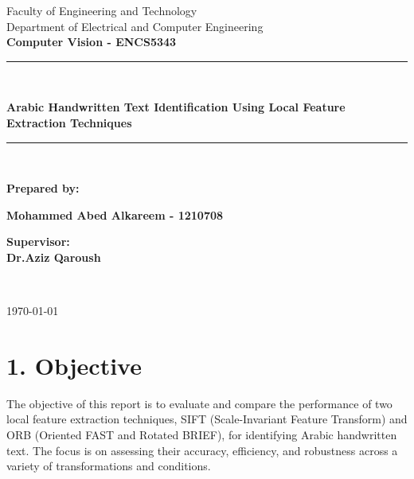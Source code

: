 \documentclass[12pt]{article}
\begin{document}
\begin{titlepage}
    \centering
    \vspace{-2cm}
    
    \vspace{1.5cm}


    {\Large Faculty of Engineering and Technology\\}
    {\Large Department of Electrical and Computer Engineering\\}
    \vspace{1cm}
    {\Large\bfseries \textbf{Computer Vision - ENCS5343}\\}


     \vspace{1.5cm}
    \rule{\textwidth}{0.4mm}\\
    \vspace{0.5cm}



    {\LARGE\bfseries
    Arabic Handwritten Text Identification Using Local Feature Extraction Techniques
     \\}
    \vspace{0.5cm}
    \rule{\textwidth}{0.4mm}\\
    
    \vspace{1.5cm}

    {\textbf{Prepared by:}\\ \vspace{0.5cm}}
    
    {\textbf{Mohammed Abed Alkareem - 1210708}\\}

    \vfill
    {\textbf{Supervisor:}\\ \vspace{0.5cm}}
    {\textbf{ Dr.Aziz Qaroush}}
    \vfill


    
    {\Large {}\\ \vspace{0.5cm}}

    {\Large \today}
\end{titlepage}

\section*{1. Objective}
The objective of this report is to evaluate and compare the performance of two local feature extraction techniques, SIFT (Scale-Invariant Feature Transform) and ORB (Oriented FAST and Rotated BRIEF), for identifying Arabic handwritten text. The focus is on assessing their accuracy, efficiency, and robustness across a variety of transformations and conditions.
\end{document}
